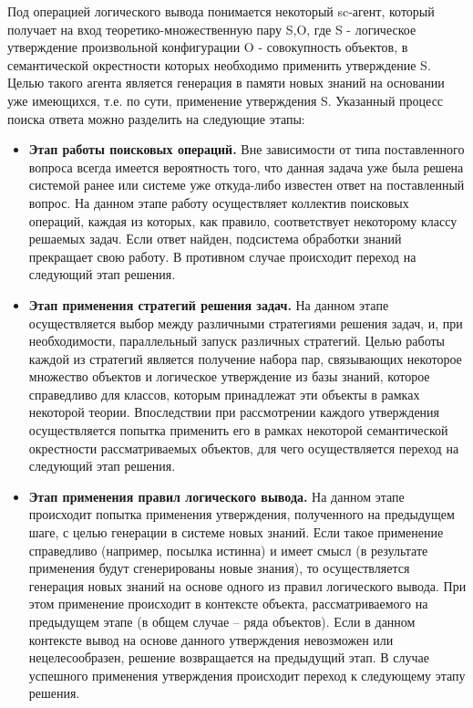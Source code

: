 Под операцией логического вывода понимается некоторый sc-агент, который получает на вход теоретико-множественную пару {S,O}, где S - логическое утверждение произвольной конфигурации O - совокупность объектов, в семантической окрестности которых необходимо применить утверждение S. Целью такого агента является генерация в памяти новых знаний на основании уже имеющихся, т.е. по сути, применение утверждения S. Указанный процесс поиска ответа можно разделить на следующие этапы:

\begin{itemize}
	\item{\textbf{Этап работы поисковых операций.} Вне зависимости от типа поставленного вопроса всегда имеется вероятность того, что данная задача уже была решена системой ранее или системе уже 	откуда-либо известен ответ на поставленный вопрос. На данном этапе работу осуществляет коллектив поисковых операций, каждая из которых, как правило, соответствует некоторому классу	решаемых задач. Если ответ найден, подсистема обработки знаний прекращает свою работу. В противном случае происходит переход на следующий этап решения.}
	\item{\textbf{Этап применения стратегий решения задач.}	На данном этапе осуществляется выбор между
	различными стратегиями решения задач, и, при необходимости, параллельный запуск различных стратегий. Целью работы каждой из стратегий является получение набора пар, связывающих некоторое множество объектов и логическое утверждение из базы знаний, которое справедливо для классов, которым принадлежат эти объекты в рамках некоторой теории. Впоследствии при	рассмотрении каждого утверждения осуществляется	попытка применить его в рамках некоторой семантической окрестности рассматриваемых объектов, для чего осуществляется переход на следующий этап решения.}
	\item{\textbf{Этап применения правил логического вывода.} На данном этапе происходит попытка применения утверждения, полученного на предыдущем шаге, с целью генерации в системе	новых знаний. Если такое применение справедливо (например, посылка истинна) и имеет смысл (в результате применения будут сгенерированы новые знания), то осуществляется генерация новых знаний на основе одного из правил логического вывода. При этом применение происходит в контексте объекта, рассматриваемого на предыдущем этапе (в общем случае – ряда объектов). Если в данном контексте вывод на основе данного утверждения	невозможен или нецелесообразен, решение возвращается на предыдущий этап. В случае успешного применения утверждения происходит переход к следующему этапу решения.}

\end{itemize}
